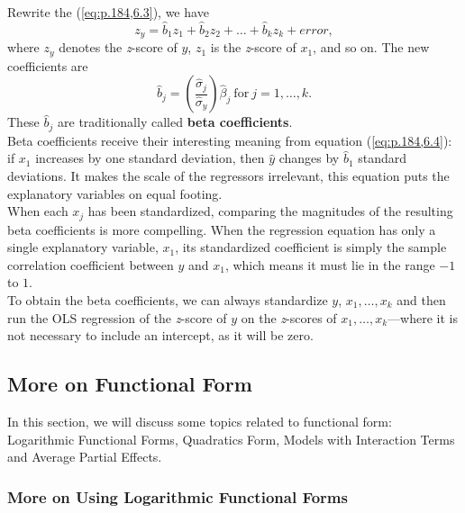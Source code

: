 \documentclass[a4paper, 10pt]{article}
\theoremstyle{definition}	%
\begin{document}
Rewrite the (\ref{eq:p.184,6.3}), we have
\begin{equation}
    z_y = \hat{b}_1 z_1 + \hat{b}_2 z_2 + \dots + \hat{b}_k z_k + error, \label{eq:p.184,6.4}
\end{equation}
where $z_y$ denotes the \textit{z}-score of $y$, $z_1$ is the \textit{z}-score of $x_1$, and so on. The new coefficients are
\begin{equation}
    \hat{b}_j = \left( \frac{\hat{\sigma}_j}{\hat{\sigma}_y} \right) \hat{\beta}_j \ \text{for} \ j = 1, \dots, k. \label{eq:p.184,6.5}
\end{equation}
These $\hat{b}_j$ are traditionally called \textbf{beta coefficients}.\\ 
Beta coefficients receive their interesting meaning from equation (\ref{eq:p.184,6.4}): if $x_1$ increases by one standard deviation, then $\hat{y}$ changes by $\hat{b}_1$ standard deviations. It makes the scale of the regressors irrelevant, this equation puts the explanatory variables on equal footing.\\
When each $x_j$ has been standardized, comparing the magnitudes of the resulting beta coefficients is more compelling. When the regression equation has only a single explanatory variable, $x_1$, its standardized coefficient is simply the sample correlation coefficient between $y$ and $x_1$, which means it must lie in the range $-1$ to $1$.\\
To obtain the beta coefficients, we can always standardize $y$, $x_1, \dots, x_k$ and then run the OLS regression of the \textit{z}-score of $y$ on the \textit{z}-scores of $x_1, \dots, x_k$—where it is not necessary to include an intercept, as it will be zero. 

\subsection{More on Functional Form}
In this section, we will discuss some topics related to functional form: Logarithmic Functional Forms, Quadratics Form, Models with Interaction Terms and Average Partial Effects.

\subsubsection{More on Using Logarithmic Functional Forms}
\end{document}
